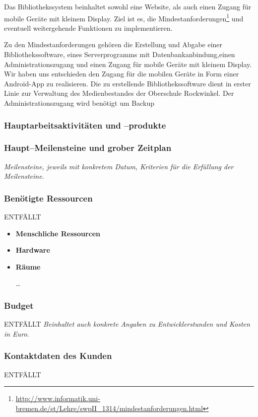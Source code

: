 \documentclass[fontsize=12pt,paper=a4,twoside]{scrartcl}
\begin{document}
Das Bibliothekssystem beinhaltet sowohl eine Website, als auch einen Zugang für mobile Geräte mit kleinem Display. Ziel ist es, die Mindestanforderungen\footnote{\url{http://www.informatik.uni-bremen.de/st/Lehre/swpII_1314/mindestanforderungen.html}} und eventuell weitergehende Funktionen zu implementieren.

Zu den Mindestanforderungen gehören die Erstellung und Abgabe einer Bibliothekssoftware, eines Serverprogramms mit Datenbankanbindung,einen Administrationszugang und einen Zugang für mobile Geräte mit kleinem Display. Wir haben uns entschieden den Zugang für die mobilen Geräte in Form einer Android-App zu realisieren. Die zu erstellende Bibliothekssoftware dient in erster Linie zur Verwaltung des Medienbestandes der Oberschule Rockwinkel. Der Administrationszugang wird benötigt um Backup


\subsubsection{Hauptarbeitsaktivitäten und --produkte}

\subsubsection{Haupt--Meilensteine und grober Zeitplan}

{\em Meilensteine, jeweils mit konkretem Datum,
 Kriterien für die Erfüllung der Meilensteine.}


\subsubsection{Benötigte Ressourcen}
ENTFÄLLT
\begin{itemize}
\item \textbf{Menschliche Ressourcen}

\item \textbf{Hardware}

\item \textbf{Räume}

\dots

\end{itemize}

\subsubsection{Budget}
ENTFÄLLT
{\em Beinhaltet auch konkrete Angaben zu Entwicklerstunden und Kosten in Euro.}


\subsubsection{Kontaktdaten des Kunden}
ENTFÄLLT
\end{document}
